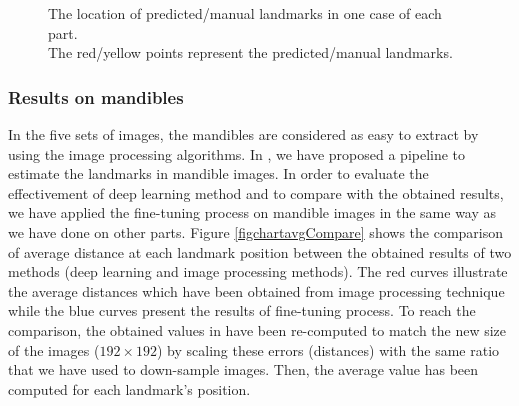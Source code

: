 \documentclass[review]{elsarticle}
\begin{document}
\begin{figure}[h!]
    \centering
    \caption{The location of predicted/manual landmarks in one case of each part.\\The red/yellow points represent the predicted/manual landmarks.}
    \label{figpdl}
\end{figure}

\pagebreak
\subsubsection{Results on mandibles}
In the five sets of images, the mandibles are considered as easy to extract by using the image processing algorithms. In \cite{le2017maelab}, we have proposed a pipeline to estimate the landmarks in mandible images. In order to evaluate the effectivement of deep learning method and to compare with the obtained results, we have applied the fine-tuning process on mandible images in the same way as we have done on other parts. Figure \ref{figchartavgCompare} shows the comparison of average distance at each landmark position between the obtained results of two methods (deep learning and image processing methods). The red curves illustrate the average distances which have been obtained from image processing technique while the blue curves present the results of fine-tuning process. To reach the comparison, the obtained values in \cite{le2017maelab} have been re-computed to match the new size of the images ($192 \times 192$) by scaling these errors (distances) with the same ratio that we have used to down-sample images. Then, the average value has been computed for each landmark’s position.
\end{document}
